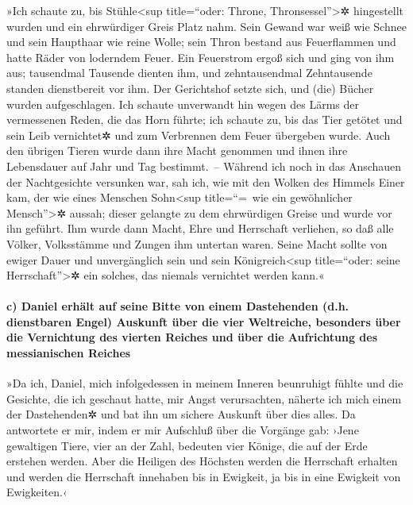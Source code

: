»Ich schaute zu, bis Stühle\textless sup title=``oder:
Throne, Thronsessel''\textgreater✲ hingestellt wurden und ein
ehrwürdiger Greis Platz nahm. Sein Gewand war weiß wie Schnee und sein
Haupthaar wie reine Wolle; sein Thron bestand aus Feuerflammen und hatte
Räder von loderndem Feuer. Ein Feuerstrom ergoß sich und
ging von ihm aus; tausendmal Tausende dienten ihm, und zehntausendmal
Zehntausende standen dienstbereit vor ihm. Der Gerichtshof setzte sich,
und (die) Bücher wurden aufgeschlagen. Ich schaute
unverwandt hin wegen des Lärms der vermessenen Reden, die das Horn
führte; ich schaute zu, bis das Tier getötet und sein Leib vernichtet✲
und zum Verbrennen dem Feuer übergeben wurde. Auch den
übrigen Tieren wurde dann ihre Macht genommen und ihnen ihre Lebensdauer
auf Jahr und Tag bestimmt.~-- Während ich noch in das
Anschauen der Nachtgesichte versunken war, sah ich, wie mit den Wolken
des Himmels Einer kam, der wie eines Menschen Sohn\textless sup
title=``=~wie ein gewöhnlicher Mensch''\textgreater✲ aussah; dieser
gelangte zu dem ehrwürdigen Greise und wurde vor ihn geführt.
Ihm wurde dann Macht, Ehre und Herrschaft verliehen, so
daß alle Völker, Volksstämme und Zungen ihm untertan waren. Seine Macht
sollte von ewiger Dauer und unvergänglich sein und sein
Königreich\textless sup title=``oder: seine Herrschaft''\textgreater✲
ein solches, das niemals vernichtet werden kann.«

\hypertarget{c-daniel-erhuxe4lt-auf-seine-bitte-von-einem-dastehenden-d.h.-dienstbaren-engel-auskunft-uxfcber-die-vier-weltreiche-besonders-uxfcber-die-vernichtung-des-vierten-reiches-und-uxfcber-die-aufrichtung-des-messianischen-reiches}{%
\paragraph{c) Daniel erhält auf seine Bitte von einem Dastehenden (d.h.
dienstbaren Engel) Auskunft über die vier Weltreiche, besonders über die
Vernichtung des vierten Reiches und über die Aufrichtung des
messianischen
Reiches}\label{c-daniel-erhuxe4lt-auf-seine-bitte-von-einem-dastehenden-d.h.-dienstbaren-engel-auskunft-uxfcber-die-vier-weltreiche-besonders-uxfcber-die-vernichtung-des-vierten-reiches-und-uxfcber-die-aufrichtung-des-messianischen-reiches}}

»Da ich, Daniel, mich infolgedessen in meinem Inneren
beunruhigt fühlte und die Gesichte, die ich geschaut hatte, mir Angst
verursachten, näherte ich mich einem der Dastehenden✲ und
bat ihn um sichere Auskunft über dies alles. Da antwortete er mir, indem
er mir Aufschluß über die Vorgänge gab: ›Jene gewaltigen
Tiere, vier an der Zahl, bedeuten vier Könige, die auf der Erde erstehen
werden. Aber die Heiligen des Höchsten werden die
Herrschaft erhalten und werden die Herrschaft innehaben bis in Ewigkeit,
ja bis in eine Ewigkeit von Ewigkeiten.‹

